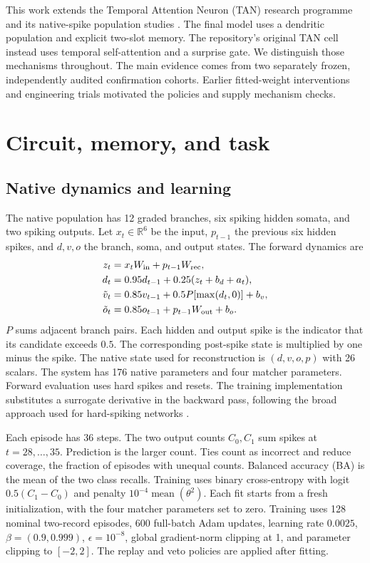 \documentclass[10pt]{article}
\newcommand{\R}{\mathbb{R}}
\begin{document}
This work extends the Temporal Attention Neuron (TAN) research programme and its native-spike population studies \cite{tanrepo,populations}. The final model uses a dendritic population and explicit two-slot memory. The repository's original TAN cell instead uses temporal self-attention and a surprise gate. We distinguish those mechanisms throughout. The main evidence comes from two separately frozen, independently audited confirmation cohorts. Earlier fitted-weight interventions and engineering trials motivated the policies and supply mechanism checks.

\section{Circuit, memory, and task}
\subsection{Native dynamics and learning}
The native population has 12 graded branches, six spiking hidden somata, and two spiking outputs. Let $x_t\in\R^6$ be the input, $p_{t-1}$ the previous six hidden spikes, and $d,v,o$ the branch, soma, and output states. The forward dynamics are
\begin{align}
 z_t &= x_t W_{\rm in}+p_{t-1}W_{\rm rec}, \\
 d_t &= 0.95d_{t-1}+0.25(z_t+b_d+a_t), \\
 \tilde v_t &= 0.85v_{t-1}+0.5P[\max(d_t,0)]+b_v, \\
 \tilde o_t &= 0.85o_{t-1}+p_{t-1}W_{\rm out}+b_o.
\end{align}
$P$ sums adjacent branch pairs. Each hidden and output spike is the indicator that its candidate exceeds $0.5$. The corresponding post-spike state is multiplied by one minus the spike. The native state used for reconstruction is $(d,v,o,p)$ with 26 scalars. The system has 176 native parameters and four matcher parameters. Forward evaluation uses hard spikes and resets. The training implementation substitutes a surrogate derivative in the backward pass, following the broad approach used for hard-spiking networks \cite{zenke2018}.

Each episode has 36 steps. The two output counts $C_0,C_1$ sum spikes at $t=28,\ldots,35$. Prediction is the larger count. Ties count as incorrect and reduce coverage, the fraction of episodes with unequal counts. Balanced accuracy (BA) is the mean of the two class recalls. Training uses binary cross-entropy with logit $0.5(C_1-C_0)$ and penalty $10^{-4}\operatorname{mean}(\theta^2)$. Each fit starts from a fresh initialization, with the four matcher parameters set to zero. Training uses 128 nominal two-record episodes, 600 full-batch Adam updates, learning rate $0.0025$, $\beta=(0.9,0.999)$, $\epsilon=10^{-8}$, global gradient-norm clipping at 1, and parameter clipping to $[-2,2]$. The replay and veto policies are applied after fitting.
\end{document}
